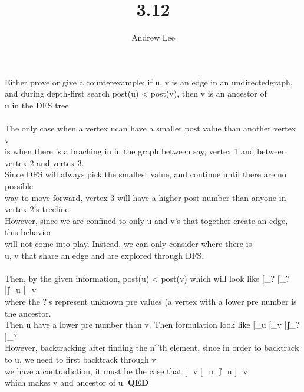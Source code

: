 \documentclass[10pt,a4paper,oneside]{article}
\begin{document}
\title{3.12}\author{Andrew Lee}\maketitle{}

\textrm{Either prove or give a counterexample: if {u, v} is an edge in an undirected}\newline\textrm{graph, and during depth-first search post(u) < post(v), then v is an ancestor of}\\\textrm{u in the DFS tree.}\\\\
\textrm{The only case when a vertex }u\textrm{can have a smaller post value than another vertex }v\\\textrm{ is when there is a braching in in the graph between say, vertex 1 and between vertex 2 and vertex 3.}\\\textrm{Since DFS will always pick the smallest value, and continue until there are no possible}\\\textrm{way to move forward, vertex 3 will have a higher post number than anyone in vertex 2's treeline}\\\textrm{However, since we are confined to only u and v's that together create an edge, this behavior}\\\textrm{will not come into play. Instead, we can only consider where there is}\\
\textrm{u, v that share an edge and are explored through DFS.}\\\\
\textrm{Then, by the given information, } post(u) < post(v)\textrm{ which will look like } [_{?}  [_{?}  |\|	]_{u} ]_{v}\\
\textrm{where the ?'s represent unknown pre values (a vertex with a lower pre number is the ancestor.}\\\textrm{ Then u have a lower pre number than v. Then formulation look like }[_{u}  [_{v}  |\|	]_{?} ]_{?}\\
\textrm{However, backtracking after finding the n}^{th}\textrm{ element, since in order to backtrack to u, we need to first backtrack through v}\\
\textrm{we have a contradiction, it must be the case that }[_{v}  [_{u}  |\|	]_{u} ]_{v}\\
\textrm{which makes v and ancestor of u. \textbf{QED}} 
\end{document}
